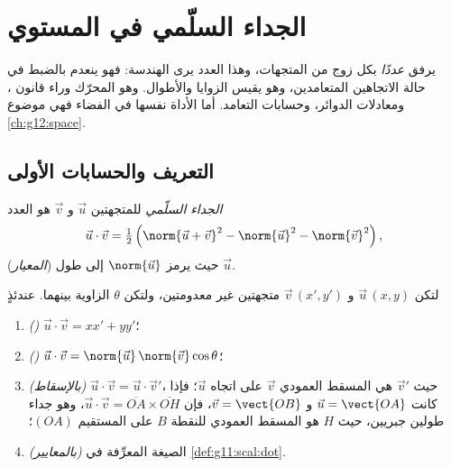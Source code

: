 \chapter{الجداء السلّمي في المستوي}\label{ch:g11:scal}

يرفق  \emph{عددًا} بكل زوج من المتجهات، وهذا العدد
يرى الهندسة: فهو ينعدم بالضبط في حالة الاتجاهين المتعامدين،
وهو يقيس الزوايا والأطوال. وهو المحرّك وراء قانون ،
ومعادلات الدوائر، وحسابات التعامد. أما الأداة نفسها في الفضاء
فهي موضوع \cref{ch:g12:space}.

\section{التعريف والحسابات الأولى}

\begin{definition}\label{def:g11:scal:dot}
\emph{الجداء السلّمي} للمتجهتين $\vec u$
و $\vec v$ هو العدد
\[
\vec u \cdot \vec v
= \tfrac12\left(\norm{\vec u + \vec v}^2 - \norm{\vec u}^2
- \norm{\vec v}^2\right),
\]
حيث يرمز $\norm{\vec u}$ إلى طول (\emph{المعيار})  $\vec u$.
\end{definition}

\begin{theorem}\label{thm:g11:scal:faces}
لتكن $\vec u\,(x, y)$ و $\vec v\,(x', y')$ متجهتين غير معدومتين، ولتكن
$\theta$ الزاوية بينهما. عندئذٍ
\begin{enumerate}
  \item \emph{()} $\vec u \cdot \vec v = xx' + yy'$؛
  \item \emph{()} $\vec u \cdot \vec v =
        \norm{\vec u}\,\norm{\vec v}\cos\theta$؛
  \item \emph{(بالإسقاط)} $\vec u \cdot \vec v = \vec u \cdot \vec v'$،
        حيث $\vec v'$ هي المسقط العمودي  $\vec v$ على
        اتجاه $\vec u$؛ فإذا كانت $\vec u = \vect{OA}$ و
        $\vec v = \vect{OB}$، فإن
        $\vec u \cdot \vec v = \overline{OA} \times \overline{OH}$، وهو
        جداء طولين جبريين، حيث $H$ هو المسقط العمودي للنقطة
        $B$ على المستقيم $(OA)$؛
  \item \emph{(بالمعايير)} الصيغة المعرِّفة في \cref{def:g11:scal:dot}.
\end{enumerate}
\end{theorem}

